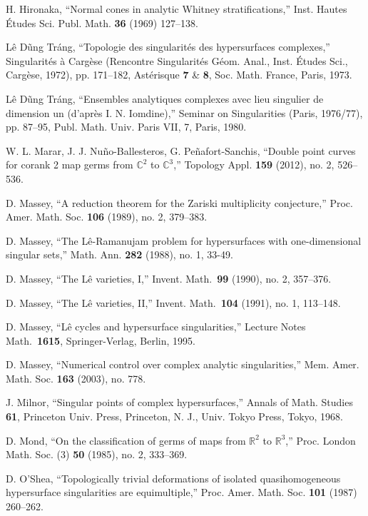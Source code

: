 \documentclass[a4paper,fleqn,11pt]{amsart}
\theoremstyle{definition}
\theoremstyle{remark}
\numberwithin{equation}{section}
\begin{document}
\begin{thebibliography}{10}
 H. Hironaka, ``Normal cones in analytic Whitney
stratifications,'' Inst. Hautes \'Etudes Sci. Publ. Math. \textbf{36}
(1969) 127--138.

 L\^e D\~ung Tr\'ang, ``Topologie des singularit\'es des hypersurfaces complexes,'' Singularit\'es \`a Carg\`ese (Rencontre Singularit\'es G\'eom. Anal., Inst. \'Etudes Sci., Carg\`ese, 1972), pp. 171--182, Ast\'erisque
\textbf{7} \& \textbf{8}, Soc. Math. France, Paris, 1973.

 L\^e D\~ung Tr\'ang, ``Ensembles analytiques complexes avec lieu singulier de dimension un (d'apr\`es I. N. Iomdine),'' Seminar on Singularities (Paris, 1976/77), pp. 87--95, Publ. Math. Univ. Paris VII, 7, Paris, 1980.

 W. L. Marar, J. J. Nu\~{n}o-Ballesteros, G. Pe\~{n}afort-Sanchis, ``Double point curves for corank 2 map germs from $\mathbb C^2$  to $\mathbb C^3$,'' Topology Appl. \textbf{159}  (2012),  no. 2, 526--536. 

 D. Massey, ``A reduction theorem for the Zariski
multiplicity conjecture,'' Proc. Amer. Math. Soc. \textbf{106} (1989), no. 2,
379--383.

 D. Massey, ``The L\^e-Ramanujam problem for hypersurfaces with one-dimensional singular sets,'' Math. Ann. \textbf{282} (1988), no. 1, 33-49.

 D. Massey, ``The L\^e varieties, I,'' Invent. Math.~\textbf{99} (1990), no. 2, 357--376.

 D. Massey, ``The L\^e varieties, II,'' Invent. Math.~\textbf{104} (1991), no. 1, 113--148.

 D. Massey, ``L\^e cycles and hypersurface singularities,'' Lecture Notes Math.~\textbf{1615}, Springer-Verlag, Berlin, 1995.

 D. Massey, ``Numerical control over complex analytic singularities,'' Mem. Amer. Math. Soc. \textbf{163} (2003), no. 778.  

 J. Milnor, ``Singular points of complex hypersurfaces,'' Annals of Math. Studies \textbf{61}, Princeton Univ. Press, Princeton, N. J., Univ. Tokyo Press, Tokyo, 1968.

 D. Mond, ``On the classification of germs of maps from $\mathbb{R}^2$ to $\mathbb{R}^3$,'' Proc. London Math. Soc. (3) \textbf{50} (1985), no. 2, 333--369. 

 D. O'Shea, ``Topologically trivial deformations
of isolated quasihomogeneous hypersurface singularities are
equimultiple,'' Proc. Amer. Math. Soc. \textbf{101} (1987) 260--262.


\end{thebibliography}
\end{document}
